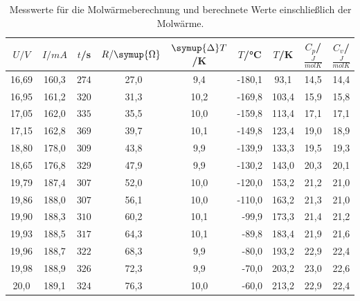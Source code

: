 \begin{table}
    \centering
    \caption{Messwerte für die Molwärmeberechnung und berechnete Werte einschließlich der Molwärme.}
    \label{Tab1}
    \begin{tabular}{S[table-format=2.1] S S S[table-format=2.1] S S S S S} %
      \toprule
       {$U/ \si{V}$}& {$I/\si{mA}$} & {$t$/s} & {$R/\symup{\Omega}$} & {$\symup{\Delta}T$/K} & {$T$/°C} & {$T$/K} & {$C_{\si{p}}$/$\frac{\si{J}}{\si{molK}}$} &{$C_{\si{v}}$/$\frac{\si{J}}{\si{molK}}$} \\
      \midrule
      \midrule
          {16,69} & {160,3}  & {$274$} & {~27,0} &  9,4 & {-180,1} &  93,1 & {14,5} & {14,4} \\
          {16,95} & {161,2}  & {$320$} & {~31,3} & 10,2 & {-169,8} & 103,4 & {15,9} & {15,8} \\
          {17,05} & {162,0}  & {$335$} & {~35,5} & 10,0 & {-159,8} & 113,4 & {17,1} & {17,1} \\
          {17,15} & {162,8}  & {$369$} & {~39,7} & 10,1 & {-149,8} & 123,4 & {19,0} & {18,9} \\
          {18,80} & {178,0}  & {$309$} & {~43,8} &  9,9 & {-139,9} & 133,3 & {19,5} & {19,3} \\
          {18,65} & {176,8}  & {$329$} & {~47,9} &  9,9 & {-130,2} & 143,0 & {20,3} & {20,1} \\
          {19,79} & {187,4}  & {$307$} & {~52,0} & 10,0 & {-120,0} & 153,2 & {21,2} & {21,0} \\
          {19,86} & {188,0}  & {$307$} & {~56,1} & 10,0 & {-110,0} & 163,2 & {21,3} & {21,0} \\
          {19,90} & {188,3}  & {$310$} & {~60,2} & 10,1 & {~-99,9} & 173,3 & {21,4} & {21,2} \\
          {19,93} & {188,5}  & {$317$} & {~64,3} & 10,1 & {~-89,8} & 183,4 & {21,9} & {21,6} \\
          {19,96} & {188,7}  & {$322$} & {~68,3} &  9,9 & {~-80,0} & 193,2 & {22,9} & {22,4} \\
          {19,98} & {188,9}  & {$326$} & {~72,3} &  9,9 & {~-70,0} & 203,2 & {23,0} & {22,6} \\
          {20,0 } & {189,1}  & {$324$} & {~76,3} & 10,0 & {~-60,0} & 213,2 & {22,9} & {22,4} \\

\end{tabular}
\end{table}
